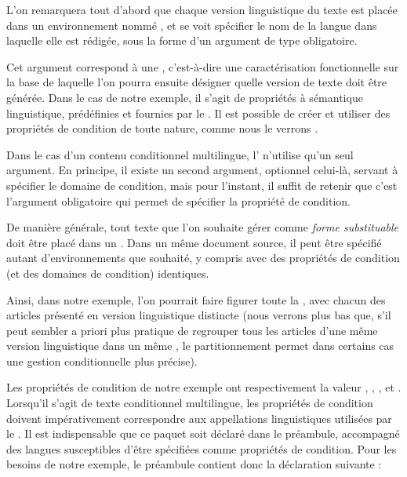 \documentclass{article}
\begin{document}
L'on remarquera tout d'abord que chaque version linguistique du texte est placée dans un environnement nommé , et se voit spécifier le nom de la langue dans laquelle elle est rédigée, sous la forme d'un argument de type obligatoire.

Cet argument correspond à une , c'est-à-dire une caractérisation fonctionnelle sur la base de laquelle l'on pourra ensuite désigner quelle version de texte doit être générée. Dans le cas de notre exemple, il s'agit de propriétés à sémantique linguistique, prédéfinies et fournies par le . Il est possible de créer et utiliser des propriétés de condition de toute nature, comme nous le verrons .

Dans le cas d'un contenu conditionnel multilingue, l' n'utilise qu'un seul argument. En principe, il existe un second argument, optionnel celui-là, servant à spécifier le domaine de condition, mais pour l'instant, il suffit de retenir que c'est l'argument obligatoire qui permet de spécifier la propriété de condition.

De manière générale, tout texte que l'on souhaite gérer comme \emph{forme substituable} doit être placé dans un . Dans un même document source, il peut être spécifié autant d'environnements  que souhaité, y compris avec des propriétés de condition (et des domaines de condition) identiques.

Ainsi, dans notre exemple, l'on pourrait faire figurer toute la , avec chacun des articles présenté en version linguistique distincte (nous verrons plus bas que, s'il peut sembler a priori plus pratique de regrouper tous les articles d'une même version linguistique dans un même , le partitionnement permet dans certains cas une gestion conditionnelle plus précise).

Les propriétés de condition de notre exemple ont respectivement la valeur , , ,  et . Lorsqu'il s'agit de texte conditionnel multilingue, les propriétés de condition doivent impérativement correspondre aux appellations linguistiques utilisées par le . Il est indispensable que ce paquet soit déclaré dans le préambule, accompagné des langues susceptibles d'être spécifiées comme propriétés de condition. Pour les besoins de notre exemple, le préambule contient donc la déclaration suivante :
\end{document}
